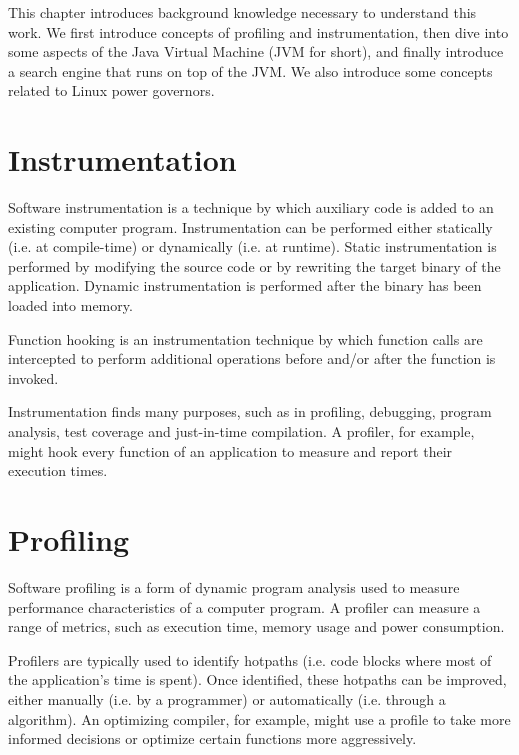 
This chapter introduces background knowledge necessary to understand this work. We first introduce concepts of profiling and instrumentation, then dive into some aspects of the Java Virtual Machine (JVM for short), and finally introduce a search engine that runs on top of the JVM. We also introduce some concepts related to Linux power governors.

\section{Instrumentation}

Software instrumentation is a technique by which auxiliary code is added to an existing computer program. Instrumentation can be performed either statically (i.e. at compile-time) or dynamically (i.e. at runtime). Static instrumentation is performed by modifying the source code or by rewriting the target binary of the application. Dynamic instrumentation is performed after the binary has been loaded into memory.

Function hooking is an instrumentation technique by which function calls are intercepted to perform additional operations before and/or after the function is invoked.

Instrumentation finds many purposes, such as in profiling, debugging, program analysis, test coverage and just-in-time compilation. A profiler, for example, might hook every function of an application to measure and report their execution times.



\section{Profiling}

Software profiling is a form of dynamic program analysis used to measure performance characteristics of a computer program. A profiler can measure a range of metrics, such as execution time, memory usage and power consumption.

Profilers are typically used to identify hotpaths (i.e. code blocks where most of the application's time is spent). Once identified, these hotpaths can be improved, either manually (i.e. by a programmer) or automatically (i.e. through a algorithm). An optimizing compiler, for example, might use a profile to take more informed decisions or optimize certain functions more aggressively.

